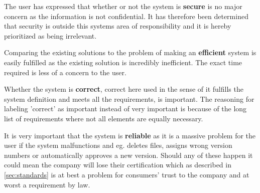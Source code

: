 The user has expressed that whether or not the system is \textbf{secure} is no major concern as the information is not confidential.
It has therefore been determined that security is outside this systems area of responsibility and it is hereby prioritized as being irrelevant.

Comparing the existing solutions to the problem of making an \textbf{efficient} system is easily fulfilled as the existing solution is incredibly inefficient.
The exact time required is less of a concern to the user.

Whether the system is \textbf{correct}, correct here used in the sense of it fulfills the system definition and meets all the requirements, is important.
The reasoning for labeling 'correct' as important instead of very important is because of the long list of requirements where not all elements are equally necessary.

It is very important that the system is \textbf{reliable} as it is a massive problem for the user if the system malfunctions and eg. deletes files, assigns wrong version numbers or automatically approves a new version.
Should any of these happen it could mean the company will lose their certification which as described in \cref{sec:standards} is at best a problem for consumers' trust to the company and at worst a requirement by law.

